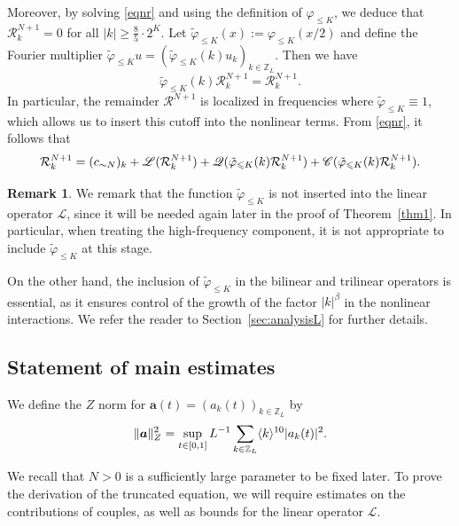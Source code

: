 \documentclass[UTF-8,reqno]{amsart}
\numberwithin{equation}{section}
\theoremstyle{definition}
\newtheorem{remark}[theorem]{Remark}
\def\geq{\geqslant}
\def\leq{\leqslant}
\def\geq{\geqslant}
\def\leq{\leqslant}
\begin{document}
Moreover, by solving \eqref{eqnr} and using the definition of $\varphi_{\leq K}$, we deduce that $\mathcal{R}_k^{N+1}=0$ for all $|k|\geq \frac85\cdot 2^K$.  Let $\tilde\varphi_{\leq K}(x):=\varphi_{\leq K}(x/2)$ and  define the Fourier multiplier $\tilde\varphi_{\leq K}u=(\tilde\varphi_{\leq K}(k)u_k)_{k\in\mathbb{Z}_L}$. Then we
have  $$\tilde\varphi_{\leq K} (k)\mathcal{R}_k^{N+1}=\mathcal{R}_k^{N+1}.$$  
In particular, the remainder $\mathcal{R}^{N+1}$ is localized in frequencies where $\tilde\varphi_{\leq K}\equiv 1$, which allows us to insert this cutoff into the nonlinear terms.
From \eqref{eqnr}, it follows that
\begin{equation}\mathcal{R}_k^{N+1}=(c_{\sim N})_k+\mathscr{L}(\mathcal{R}_k^{N+1}) +\mathscr{Q}(\tilde\varphi_{\leq K}(k)\mathcal{R}_k^{N+1})+\mathscr{C}(\tilde\varphi_{\leq K}(k)\mathcal{R}_k^{N+1}).\notag
\end{equation}  
\begin{remark}
We remark that the function $\tilde\varphi_{\leq K}$ is not inserted into the linear operator $\mathscr{L}$, since it will be needed again later in the proof of Theorem~\ref{thm1}.
In particular, when treating the high-frequency component, it is not appropriate to include $\tilde\varphi_{\leq K}$ at this stage.

On the other hand, the inclusion of $\tilde\varphi_{\leq K}$ in the bilinear and trilinear operators is essential, as it ensures control of the growth of the factor $|k|^\beta$ in the nonlinear interactions.
We refer the reader to Section~\ref{sec:analysisL} for further details.
\end{remark}

\subsection{Statement of main estimates}\label{state} 
We define the $Z$ norm  
  for $\boldsymbol a(t)=(a_k(t))_{k \in \mathbb{Z}_L}$ by
\begin{equation*}
\|\boldsymbol a\|_{Z}^2 = \sup_{t\in[0,1]} L^{-1}\sum_{k \in \mathbb{Z}_L}\langle k\rangle^{10}|{a}_k(t)|^2 .\notag
\end{equation*}

  We recall that $N>0$ is a sufficiently large parameter to be fixed later.
To prove the derivation of the truncated equation, we will require estimates on the contributions of couples, as well as bounds for the linear operator $\mathscr{L}$.
\end{document}

